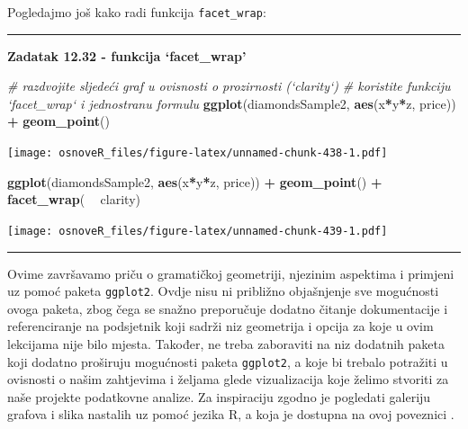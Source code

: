\documentclass[]{book}
\newenvironment{Shaded}{\begin{snugshade}}{\end{snugshade}}
\newcommand{\KeywordTok}[1]{\textcolor[rgb]{0.13,0.29,0.53}{\textbf{#1}}}
\newcommand{\StringTok}[1]{\textcolor[rgb]{0.31,0.60,0.02}{#1}}
\newcommand{\CommentTok}[1]{\textcolor[rgb]{0.56,0.35,0.01}{\textit{#1}}}
\newcommand{\OperatorTok}[1]{\textcolor[rgb]{0.81,0.36,0.00}{\textbf{#1}}}
\newcommand{\NormalTok}[1]{#1}
\theoremstyle{definition}
\theoremstyle{definition}
\theoremstyle{definition}
\theoremstyle{remark}
\begin{document}
Pogledajmo još kako radi funkcija \texttt{facet\_wrap}:

\begin{center}\rule{0.5\linewidth}{\linethickness}\end{center}

\textbf{Zadatak 12.32 - funkcija `facet\_wrap'}

\begin{Shaded}
\begin{Highlighting}[]
\CommentTok{# razdvojite sljedeći graf u ovisnosti o prozirnosti (`clarity`)}
\CommentTok{# koristite funkciju `facet_wrap` i jednostranu formulu}
\KeywordTok{ggplot}\NormalTok{(diamondsSample2, }\KeywordTok{aes}\NormalTok{(x}\OperatorTok{*}\NormalTok{y}\OperatorTok{*}\NormalTok{z, price)) }\OperatorTok{+}\StringTok{ }\KeywordTok{geom_point}\NormalTok{() }
\end{Highlighting}
\end{Shaded}

\texttt{[image: osnoveR\_files/figure-latex/unnamed-chunk-438-1.pdf]}

\begin{Shaded}
\begin{Highlighting}[]
\KeywordTok{ggplot}\NormalTok{(diamondsSample2, }\KeywordTok{aes}\NormalTok{(x}\OperatorTok{*}\NormalTok{y}\OperatorTok{*}\NormalTok{z, price)) }\OperatorTok{+}\StringTok{ }
\StringTok{  }\KeywordTok{geom_point}\NormalTok{() }\OperatorTok{+}\StringTok{ }\KeywordTok{facet_wrap}\NormalTok{( }\OperatorTok{~}\StringTok{ }\NormalTok{clarity)}
\end{Highlighting}
\end{Shaded}

\texttt{[image: osnoveR\_files/figure-latex/unnamed-chunk-439-1.pdf]}

\begin{center}\rule{0.5\linewidth}{\linethickness}\end{center}

Ovime završavamo priču o gramatičkoj geometriji, njezinim aspektima i
primjeni uz pomoć paketa \texttt{ggplot2}. Ovdje nisu ni približno
objašnjenje sve mogućnosti ovoga paketa, zbog čega se snažno preporučuje
dodatno čitanje dokumentacije i referenciranje na podsjetnik koji sadrži
niz geometrija i opcija za koje u ovim lekcijama nije bilo mjesta.
Također, ne treba zaboraviti na niz dodatnih paketa koji dodatno
proširuju mogućnosti paketa \texttt{ggplot2}, a koje bi trebalo
potražiti u ovisnosti o našim zahtjevima i željama glede vizualizacija
koje želimo stvoriti za naše projekte podatkovne analize. Za inspiraciju
zgodno je pogledati galeriju grafova i slika nastalih uz pomoć jezika R,
a koja je dostupna na ovoj poveznici .
\end{document}
